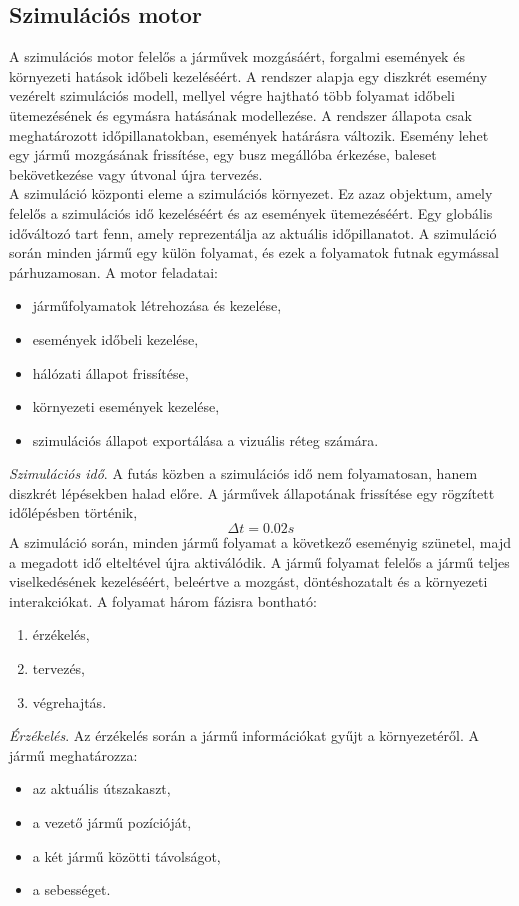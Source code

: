\documentclass[14pt,a4paper]{extarticle}
\begin{document}
\subsection{Szimulációs motor}
A szimulációs motor felelős a járművek mozgásáért, forgalmi események és környezeti hatások időbeli kezeléséért. A rendszer alapja egy diszkrét esemény vezérelt szimulációs modell, mellyel végre hajtható több folyamat időbeli ütemezésének és egymásra hatásának modellezése. A rendszer állapota csak meghatározott időpillanatokban, események határásra változik. Esemény lehet egy jármű mozgásának frissítése, egy busz megállóba érkezése, baleset bekövetkezése vagy útvonal újra tervezés.
\\
A szimuláció központi eleme a szimulációs környezet. Ez azaz objektum, amely felelős a szimulációs idő kezeléséért és az események ütemezéséért. Egy globális időváltozó tart fenn, amely reprezentálja az aktuális időpillanatot. A szimuláció során minden jármű egy külön folyamat, és ezek a folyamatok futnak egymással párhuzamosan. A motor feladatai:
\begin{itemize}
    \item járműfolyamatok létrehozása és kezelése,
    \item események időbeli kezelése,
    \item hálózati állapot frissítése,
    \item környezeti események kezelése,
    \item szimulációs állapot exportálása a vizuális réteg számára.
\end{itemize}
\textit{Szimulációs idő}. A futás közben a szimulációs idő nem folyamatosan, hanem diszkrét lépésekben halad előre. A járművek állapotának frissítése egy rögzített időlépésben történik,
$$  \Delta t = 0.02s $$
A szimuláció során, minden jármű folyamat a következő eseményig szünetel, majd a megadott idő elteltével újra aktiválódik. A jármű folyamat felelős a jármű teljes viselkedésének kezeléséért, beleértve a mozgást, döntéshozatalt és a környezeti interakciókat. A folyamat három fázisra bontható:
\begin{enumerate}
    \item érzékelés,
    \item tervezés,
    \item végrehajtás.
\end{enumerate}
\textit{Érzékelés}. Az érzékelés során a jármű információkat gyűjt a környezetéről. A jármű meghatározza:
\begin{itemize}
    \item az aktuális útszakaszt,
    \item a vezető jármű pozícióját,
    \item a két jármű közötti távolságot,
    \item a sebességet.
\end{itemize}
\end{document}
